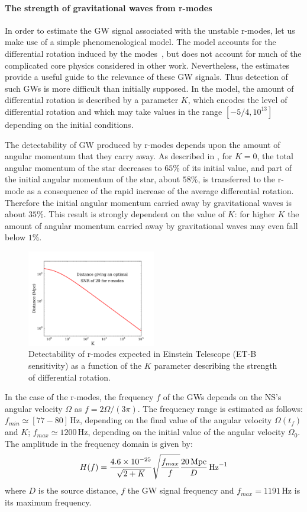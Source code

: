 \paragraph{The strength of gravitational waves from r-modes}
In order to estimate the GW signal associated with the unstable 
r-modes, let us make use of a simple phenomenological model. 
The model accounts for the differential rotation induced by 
the modes~\cite{SaTome}, but does not account for much of the 
complicated core physics considered in other work.  Nevertheless, 
the estimates provide a useful guide to the relevance of these 
GW signals.  Thus detection of such GWs is more difficult than 
initially supposed. In the model, the amount of differential 
rotation is described by a parameter $K$, which encodes the 
level of differential rotation and which may take values in 
the range $[-5/4, 10^{13}]$ depending on the initial conditions.

The detectability of GW produced by r-modes depends upon the 
amount of angular momentum that they carry away. As described 
in \cite{SaTome1}, for $K=0$, the total angular momentum of 
the star decreases to $65\%$ of its initial value, and 
part of the initial angular momentum of the star, about $58\%$, 
is transferred to the r-mode as a consequence of the rapid 
increase of the average differential rotation. Therefore the 
initial angular momentum carried away by gravitational waves 
is about $35\%$. This result is strongly dependent on the value 
of $K$: for higher $K$ the amount of angular momentum carried 
away by gravitational waves may even fall below $1\%$.

\begin{figure}
\includegraphics[width=0.5\textwidth]{./Sec_ET_ScienceCase/Rmodes_redone.pdf}
\caption{Detectability of r-modes expected in 
Einstein Telescope (ET-B sensitivity) as a function of the $K$ parameter
describing the strength of differential rotation.}
\label{fig:RmodesVsET}
\end{figure}
%
In the case of the r-modes, the frequency $f$ of the GWs
depends on the NS's angular velocity $\Omega$ as $f=2\Omega/(3\pi)$. 
The frequency range is estimated as follows:
$f_{min} \simeq [77-80]\,$Hz, depending on the final value 
of the angular velocity $\Omega (t_f)$ and $K$;
$f_{max} \simeq 1200\,$Hz, depending on the initial value 
of the angular velocity $\Omega _0$.
The amplitude in the frequency domain is given by:
\begin{equation}
H(f)=\frac{4.6\times10^{-25}}{\sqrt{2+K}}
\sqrt{\frac{f_{max}}{f}}\frac{20\,{\rm Mpc}}{D}\,{\rm Hz}^{-1}
\end{equation}
where $D$ is the source distance, $f$ the GW signal frequency 
and $f_{max}=1191\,$Hz is its maximum frequency.

